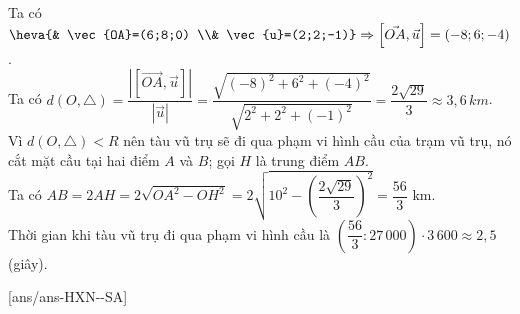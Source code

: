 \begin{ex}
{\begin{itemchoice}
         Ta có $\heva{& \vec{OA}=(6;8;0) \\& \vec{u}=(2;2;-1)} \Rightarrow \left[\vec{OA},\vec{u}\right]=(-8;6;-4)$.\\
         Ta có $d\left(O,\triangle \right)=\dfrac{\left| \left[\vec{OA},\vec{u}\right] \right|}{\left| {\vec{u}} \right|}=\dfrac{\sqrt{(-8)^2+6^2+(-4)^2}}{\sqrt{2^2+2^2+(-1)^2}}=\dfrac{2\sqrt{29}}{3}\approx 3{,}6\,km$.\\
         \itemch Vì $d\left(O,\triangle \right)<R$ nên tàu vũ trụ sẽ đi qua phạm vi hình cầu của trạm vũ trụ, nó cắt mặt cầu tại hai điểm $A$ và $B$; gọi $H$ là trung điểm $AB$.\\
         Ta có $AB=2AH=2\sqrt{OA^2-OH^2}=2\sqrt{10^2-\left(\dfrac{2\sqrt{29}}{3}\right)^2}=\dfrac{56}{3}$ km.\\
         Thời gian khi tàu vũ trụ đi qua phạm vi hình cầu là $\left(\dfrac{56}{3}\colon 27\,000\right)\cdot 3\,600\approx 2{,}5$ (giây).
     \end{itemchoice}
 }
\end{ex}
\caukq
{}[ans/ans-HXN-\sode-SA]
